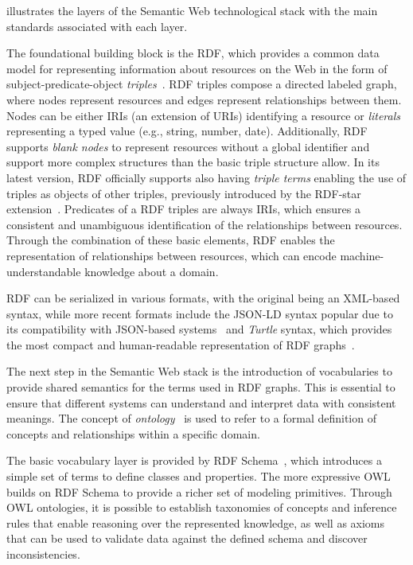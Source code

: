  illustrates the layers of the Semantic Web technological stack with the main standards associated with each layer. 

The foundational building block is the \ac{RDF}, which provides a common data model for representing information about resources on the Web in the form of subject-predicate-object \emph{triples}~\cite{rdf-concepts}.
%
\ac{RDF} triples compose a directed labeled graph, where nodes represent resources and edges represent relationships between them. 
%
Nodes can be either \acp{IRI} (an extension of \acp{URI}) identifying a resource or \emph{literals} representing a typed value (e.g., string, number, date).
%
Additionally, \ac{RDF} supports \emph{blank nodes} to represent resources without a global identifier and support more complex structures than the basic triple structure allow.
%
In its latest version, \ac{RDF} officially supports also having \emph{triple terms} enabling the use of triples as objects of other triples, previously introduced by the {RDF-star} extension~\cite{hartig2021rdfstar}.
%
Predicates of a \ac{RDF} triples are always \acp{IRI}, which ensures a consistent and unambiguous identification of the relationships between resources.
%
Through the combination of these basic elements, \ac{RDF} enables the representation of relationships between resources, which can encode machine-understandable knowledge about a domain.

\ac{RDF} can be serialized in various formats, with the original being an XML-based syntax, while more recent formats include the JSON-LD syntax popular due to its compatibility with JSON-based systems~\cite{json-ld} and \emph{Turtle} syntax, which provides the most compact and human-readable representation of \ac{RDF} graphs~\cite{turtle}.



The next step in the Semantic Web stack is the introduction of vocabularies to provide shared semantics for the terms used in \ac{RDF} graphs.
%
This is essential to ensure that different systems can understand and interpret data with consistent meanings.
%
The concept of \emph{ontology}~\cite{Vickery_1997} is used to refer to a formal definition of concepts and relationships within a specific domain.

The basic vocabulary layer is provided by \ac{RDF} Schema~\cite{rdfs}, which introduces a simple set of terms to define classes and properties. 
%
The more expressive \ac{OWL}~\cite{olw2overview} builds on \ac{RDF} Schema to provide a richer set of modeling primitives.
%
Through \ac{OWL} ontologies, it is possible to establish taxonomies of concepts and inference rules that enable reasoning over the represented knowledge, as well as axioms that can be used to validate data against the defined schema and discover inconsistencies. 

